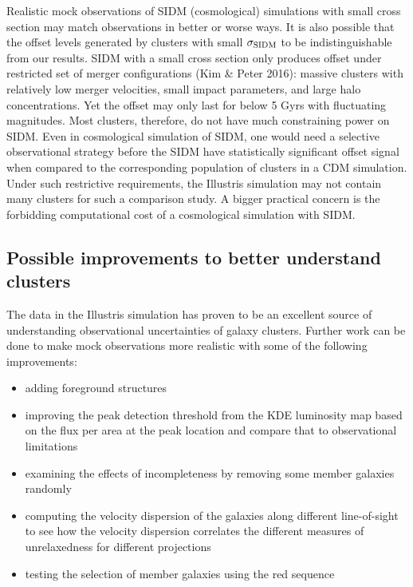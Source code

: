 Realistic mock observations of SIDM (cosmological) simulations 
with small cross section may match observations in better or worse ways. 
It is also possible that the offset levels generated by clusters with small $\sigma_{\rm SIDM}$ 
to be indistinguishable from our results. 
SIDM with a small cross section only produces offset under restricted set of 
merger configurations (Kim \& Peter 2016): 
massive clusters with relatively low merger velocities, small impact
parameters, and large halo concentrations. Yet the offset may only last
for below 5 Gyrs with fluctuating magnitudes.  
Most clusters, therefore, do not have much constraining power on SIDM.
Even in cosmological simulation of SIDM, one would need a selective observational strategy
before the SIDM have statistically significant offset signal when compared 
to the corresponding population of clusters in a CDM simulation. 
Under such restrictive requirements, the Illustris simulation may not contain 
many clusters for such a comparison study.  A bigger practical
concern is the forbidding computational cost of a cosmological simulation with SIDM.
 
 
\subsection{Possible improvements to better understand clusters}
The data in the Illustris simulation has proven to be an excellent source of
understanding observational uncertainties of galaxy clusters.
Further work can be done to make mock observations more realistic with some of
the following improvements:
\begin{itemize}
		\item adding foreground structures 
		\item improving the peak detection threshold from the KDE luminosity map based on
			the flux per area at the peak location and compare that to observational
			limitations
		\item examining the effects of incompleteness by removing some member galaxies randomly 
		\item computing the velocity dispersion of the galaxies along different
			line-of-sight to see how the velocity dispersion correlates the different
			measures of unrelaxedness for different projections
		\item testing the selection of member galaxies using the red sequence
	\end{itemize}



